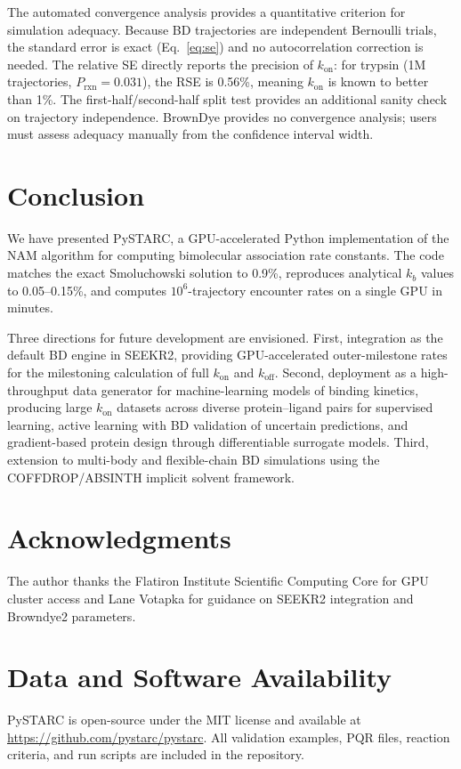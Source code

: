 \documentclass[journal=jctcce,manuscript=article,layout=twocolumn]{achemso}
\newcommand{\kon}{k_{\mathrm{on}}}
\newcommand{\koff}{k_{\mathrm{off}}}
\newcommand{\Prxn}{P_{\mathrm{rxn}}}
\begin{document}
The automated convergence analysis provides a quantitative
criterion for simulation adequacy.
Because BD trajectories are independent Bernoulli trials,
the standard error is exact (Eq.~\ref{eq:se}) and no
autocorrelation correction is needed.
The relative SE directly reports the precision of $\kon$:
for trypsin (1M trajectories, $\Prxn = 0.031$), the RSE
is 0.56\%, meaning $\kon$ is known to better than 1\%.
The first-half/second-half split test provides an additional
sanity check on trajectory independence.
BrownDye provides no convergence analysis; users must assess
adequacy manually from the confidence interval width.


\section{Conclusion}
\label{sec:conclusion}

We have presented PySTARC, a GPU-accelerated Python implementation
of the NAM algorithm for computing bimolecular association rate
constants.
The code matches the exact Smoluchowski solution to 0.9\%,
reproduces analytical $k_b$ values to 0.05--0.15\%, and
computes $10^6$-trajectory encounter rates on a single GPU
in minutes.

Three directions for future development are envisioned.
First, integration as the default BD engine in SEEKR2, providing
GPU-accelerated outer-milestone rates for the milestoning
calculation of full $\kon$ and $\koff$.
Second, deployment as a high-throughput data generator for
machine-learning models of binding kinetics, producing large
$\kon$ datasets across diverse protein--ligand pairs for
supervised learning, active learning with BD validation of
uncertain predictions, and gradient-based protein design through
differentiable surrogate models.
Third, extension to multi-body and flexible-chain BD simulations
using the COFFDROP/ABSINTH implicit solvent framework.

\section*{Acknowledgments}

The author thanks the Flatiron Institute Scientific Computing Core
for GPU cluster access and Lane Votapka for guidance on SEEKR2
integration and Browndye2 parameters.

\section*{Data and Software Availability}

PySTARC is open-source under the MIT license and available at
\url{https://github.com/pystarc/pystarc}.
All validation examples, PQR files, reaction criteria, and
run scripts are included in the repository.



\end{document}

